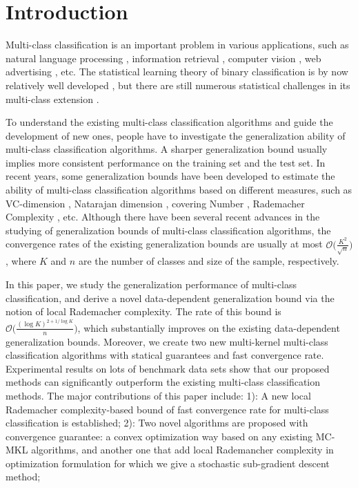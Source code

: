 \documentclass{article}
\begin{document}
\section{Introduction}
\label{submission}
Multi-class classification is an important problem in various applications,
such as natural language processing \cite{Zhang2005cs}, information retrieval \cite{hofmann2003learning}, computer vision \cite{deng2009imagenet},
web advertising \cite{beygelzimer2009conditional}, etc.
The statistical learning theory of binary classification is by now relatively well developed \cite{vapnik1998naturestatistical,mohri2012foundations},
but there are still numerous statistical challenges in its multi-class extension \cite{maximov2016tight}.

To understand the existing multi-class classification algorithms and guide the development of new ones,
people have to investigate the generalization ability of multi-class classification algorithms.
A sharper generalization bound usually implies more consistent
performance on the training set and the test set.
In recent years, some generalization bounds have been developed to
estimate the ability of multi-class classification algorithms based on different measures,
such as
VC-dimension \cite{allwein2000reducing},
Natarajan dimension \cite{daniely2014optimal},
covering Number \cite{guermeur2002combining,zhang2004statistical,Hill2007},
Rademacher Complexity \cite{koltchinskii2002empirical,mohri2012foundations,cortes2013multi}, etc.
Although there have been several recent advances in the studying of
generalization bounds of multi-class classification algorithms,
the convergence rates of the existing generalization bounds are usually at most
 $\mathcal{O}\big(\frac{K^2}{\sqrt{n}}\big)$,
where $K$ and $n$ are the number of classes and size of the sample, respectively.



In this paper, we  study the generalization performance of multi-class classification,
and derive a novel data-dependent generalization bound via the notion of local Rademacher complexity.
The rate of this bound is $\mathcal{O}\big(\frac{(\log K)^{2+{1}/{\log K}}}{n}\big)$,
which substantially improves on  the existing data-dependent generalization bounds.
Moreover, we create two new multi-kernel multi-class classification algorithms
with statical guarantees and fast convergence rate.
Experimental results on lots of benchmark data sets show that our proposed methods can significantly
outperform the existing multi-class classification methods.
The major contributions of this paper include:
 1): A new local Rademacher complexity-based bound of fast convergence rate for multi-class classification is established;
 2): Two novel algorithms are proposed with convergence guarantee: a convex optimization way based on
 any existing MC-MKL algorithms,
 and another one that add local Rademancher complexity in optimization formulation
 for which we give a stochastic sub-gradient descent method;
\end{document}
